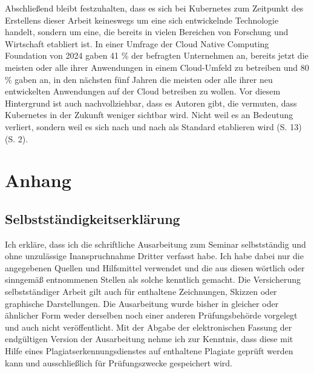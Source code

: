 \documentclass[11pt,a4paper]{article}
\begin{document}
Abschließend bleibt festzuhalten, dass es sich bei Kubernetes zum Zeitpunkt des Erstellens dieser
Arbeit keineswegs um eine sich entwickelnde Technologie handelt, sondern um eine, die bereits
in vielen Bereichen von Forschung und Wirtschaft etabliert ist. In einer Umfrage der
Cloud Native Computing Foundation von 2024 \cite{cncf} gaben 41 \% der befragten Unternehmen an,
bereits jetzt die meisten oder alle ihrer Anwendungen in einem Cloud-Umfeld zu betreiben und
80 \% gaben an, in den nächsten fünf Jahren die meisten oder alle ihrer neu entwickelten Anwendungen
auf der Cloud betreiben zu wollen.
Vor diesem Hintergrund ist auch nachvollziehbar, dass es Autoren gibt, die vermuten,
dass Kubernetes in der Zukunft weniger sichtbar wird. Nicht weil es an Bedeutung verliert,
sondern weil es sich nach und nach als Standard etablieren wird \cite{domingus2022cloud} (S. 13) \cite{Schmeling_Dargatz_2022} (S. 2).






\newpage
\section{Anhang}
\subsection{Selbstständigkeitserklärung}

Ich erkläre, dass ich die schriftliche Ausarbeitung zum Seminar selbstständig
und ohne unzulässige Inanspruchnahme Dritter verfasst habe. Ich habe dabei nur
die angegebenen Quellen und Hilfsmittel verwendet und die aus diesen wörtlich
oder sinngemäß entnommenen Stellen als solche kenntlich gemacht. Die Versicherung
selbstständiger Arbeit gilt auch für enthaltene Zeichnungen, Skizzen oder
graphische Darstellungen. Die Ausarbeitung wurde bisher in gleicher oder ähnlicher
Form weder derselben noch einer anderen Prüfungsbehörde vorgelegt und auch nicht
veröffentlicht. Mit der Abgabe der elektronischen Fassung der endgültigen Version
der Ausarbeitung nehme ich zur Kenntnis, dass diese mit Hilfe eines
Plagiatserkennungsdienstes auf enthaltene Plagiate geprüft werden kann und
ausschließlich für Prüfungszwecke gespeichert wird.
\end{document}
